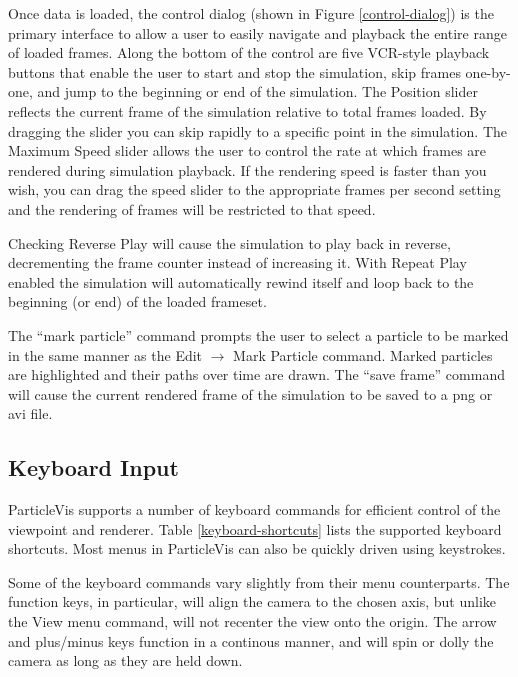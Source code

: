    Once data is loaded, the control dialog (shown in Figure \ref{control-dialog}) is the primary interface to allow a user to easily navigate and playback the entire range of loaded frames.  Along the bottom of the control are five VCR-style playback buttons that enable the user to start and stop the simulation, skip frames one-by-one, and jump to the beginning or end of the simulation.  The Position slider reflects the current frame of the simulation relative to total frames loaded.  By dragging the slider you can skip rapidly to a specific point in the simulation.  The Maximum Speed slider allows the user to control the rate at which frames are rendered during simulation playback.  If the rendering speed is faster than you wish, you can drag the speed slider to the appropriate frames per second setting and the rendering of frames will be restricted to that speed.

   Checking Reverse Play will cause the simulation to play back in reverse, decrementing the frame counter instead of increasing it.  With Repeat Play enabled the simulation will automatically rewind itself and loop back to the beginning (or end) of the loaded frameset.
   
   The ``mark particle'' command prompts the user to select a particle to be marked in the same manner as the Edit $\rightarrow$ Mark Particle command.  Marked particles are highlighted and their paths over time are drawn.  The ``save frame'' command will cause the current rendered frame of the simulation to be saved to a png or avi file.
   
\subsection{Keyboard Input}

  ParticleVis supports a number of keyboard commands for efficient control of the viewpoint and renderer.  Table \ref{keyboard-shortcuts} lists the supported keyboard shortcuts.  Most menus in ParticleVis can also be quickly driven using keystrokes.
  
  Some of the keyboard commands vary slightly from their menu counterparts.  The function keys, in particular, will align the camera to the chosen axis, but unlike the View menu command, will not recenter the view onto the origin.  The arrow and plus/minus keys function in a continous manner, and will spin or dolly the camera as long as they are held down.
  
